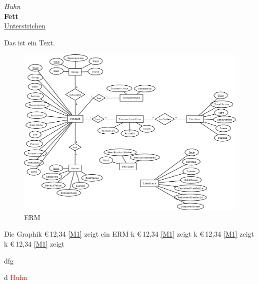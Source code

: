 \emph{Huhn} \\
\textbf{Fett} \\
\underline{Unterstrichen} \par
Das ist ein  Text. \\
\begin{figure}[ht]
	\centering
	\includegraphics[width=1\linewidth]{ERM.png}
	\caption{ERM}
	\label{M1}
\end{figure}

\newpage
\lipsum
\newpage
Die Graphik \euro\,12,34 \vref{M1} zeigt ein ERM \cite{tiobe-index} k \euro\,12,34 \vref{M1} zeigt k \euro\,12,34 \vref{M1} zeigt k \euro\,12,34 \vref{M1} zeigt

dfg \par
d
\textcolor{red}{Huhn}
\lipsum